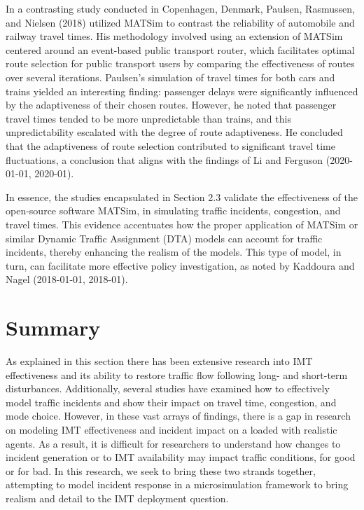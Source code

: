 \documentclass[
  letterpaper,
  DIV=11,
  numbers=noendperiod]{scrreprt}
\begin{document}
In a contrasting study conducted in Copenhagen, Denmark, Paulsen,
Rasmussen, and Nielsen (2018) utilized MATSim to contrast the
reliability of automobile and railway travel times. His methodology
involved using an extension of MATSim centered around an event-based
public transport router, which facilitates optimal route selection for
public transport users by comparing the effectiveness of routes over
several iterations. Paulsen's simulation of travel times for both cars
and trains yielded an interesting finding: passenger delays were
significantly influenced by the adaptiveness of their chosen routes.
However, he noted that passenger travel times tended to be more
unpredictable than trains, and this unpredictability escalated with the
degree of route adaptiveness. He concluded that the adaptiveness of
route selection contributed to significant travel time fluctuations, a
conclusion that aligns with the findings of Li and Ferguson (2020-01-01,
2020-01).

In essence, the studies encapsulated in Section 2.3 validate the
effectiveness of the open-source software MATSim, in simulating traffic
incidents, congestion, and travel times. This evidence accentuates how
the proper application of MATSim or similar Dynamic Traffic Assignment
(DTA) models can account for traffic incidents, thereby enhancing the
realism of the models. This type of model, in turn, can facilitate more
effective policy investigation, as noted by Kaddoura and Nagel
(2018-01-01, 2018-01).

\hypertarget{summary}{%
\section{Summary}\label{summary}}

As explained in this section there has been extensive research into IMT
effectiveness and its ability to restore traffic flow following long-
and short-term disturbances. Additionally, several studies have examined
how to effectively model traffic incidents and show their impact on
travel time, congestion, and mode choice. However, in these vast arrays
of findings, there is a gap in research on modeling IMT effectiveness
and incident impact on a loaded with realistic agents. As a result, it
is difficult for researchers to understand how changes to incident
generation or to IMT availability may impact traffic conditions, for
good or for bad. In this research, we seek to bring these two strands
together, attempting to model incident response in a microsimulation
framework to bring realism and detail to the IMT deployment question.
\end{document}
